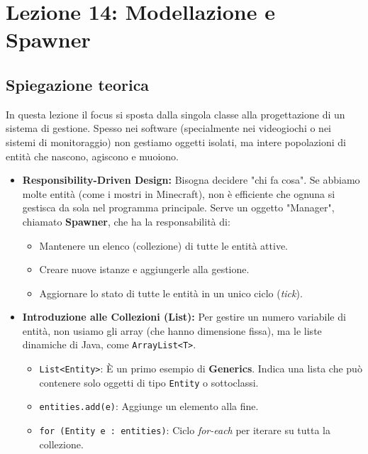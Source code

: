 \documentclass[12pt, a4paper]{article}
\begin{document}
\newpage

\section{Lezione 14: Modellazione e Spawner}

\subsection{Spiegazione teorica}
In questa lezione il focus si sposta dalla singola classe alla progettazione di un sistema di gestione. Spesso nei software (specialmente nei videogiochi o nei sistemi di monitoraggio) non gestiamo oggetti isolati, ma intere popolazioni di entità che nascono, agiscono e muoiono.

\begin{itemize}
    \item \textbf{Responsibility-Driven Design:} Bisogna decidere "chi fa cosa". Se abbiamo molte entità (come i mostri in Minecraft), non è efficiente che ognuna si gestisca da sola nel programma principale. Serve un oggetto "Manager", chiamato \textbf{Spawner}, che ha la responsabilità di:
    \begin{itemize}
        \item Mantenere un elenco (collezione) di tutte le entità attive.
        \item Creare nuove istanze e aggiungerle alla gestione.
        \item Aggiornare lo stato di tutte le entità in un unico ciclo (\textit{tick}).
    \end{itemize}

    \item \textbf{Introduzione alle Collezioni (List):} Per gestire un numero variabile di entità, non usiamo gli array (che hanno dimensione fissa), ma le liste dinamiche di Java, come \texttt{ArrayList<T>}.
    \begin{itemize}
        \item \texttt{List<Entity>}: È un primo esempio di \textbf{Generics}. Indica una lista che può contenere solo oggetti di tipo \texttt{Entity} o sottoclassi.
        \item \texttt{entities.add(e)}: Aggiunge un elemento alla fine.
        \item \texttt{for (Entity e : entities)}: Ciclo \textit{for-each} per iterare su tutta la collezione.
    \end{itemize}
\end{itemize}
\end{document}
